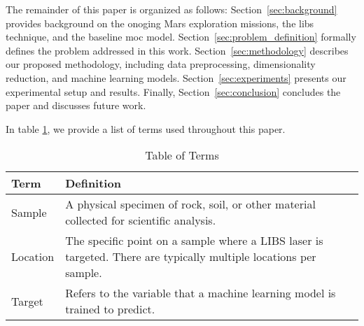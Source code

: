 The remainder of this paper is organized as follows:
Section~\ref{sec:background} provides background on the onoging Mars exploration missions, the \gls{libs} technique, and the baseline \gls{moc} model.
Section~\ref{sec:problem_definition} formally defines the problem addressed in this work.
Section~\ref{sec:methodology} describes our proposed methodology, including data preprocessing, dimensionality reduction, and machine learning models.
Section~\ref{sec:experiments} presents our experimental setup and results.
Finally, Section~\ref{sec:conclusion} concludes the paper and discusses future work.

In table \ref{tab:terms}, we provide a list of terms used throughout this paper.

\begin{table}
\centering
\begin{tabularx}{\columnwidth}{lX} %
\toprule
Term & Definition \\
\midrule
Sample & A physical specimen of rock, soil, or other material collected for scientific analysis.\\
Location & The specific point on a sample where a LIBS laser is targeted. There are typically multiple locations per sample. \\ 
Target & Refers to the variable that a machine learning model is trained to predict. \\
\bottomrule
\end{tabularx}  
\caption{Table of Terms}
\label{tab:terms}
\end{table}